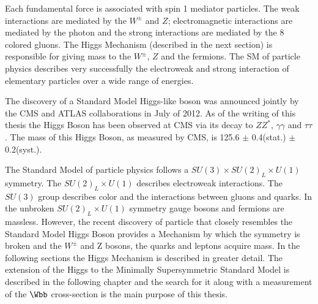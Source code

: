 Each fundamental force is associated with spin 1 mediator particles.
The weak interactions are mediated by the $W^{\pm}$ and $Z$;
electromagnetic interactions are mediated by the photon and the strong interactions
are mediated by the 8 colored gluons. The Higgs Mechanism (described in the next section) 
is responsible for giving mass to the $W^{\pm}$, $Z$ and the fermions. 
The SM of particle physics describes very successfully the electroweak and strong
interaction of elementary particles over a wide range of energies.

The discovery of a Standard Model Higgs-like boson was announced jointly 
by the CMS and ATLAS collaborations in July of 2012. %
As of the writing of this thesis the Higgs Boson has been observed at CMS via
its decay to $ZZ^{*}$, $\gamma\gamma$ and $\tau\tau$. The mass of this
Higgs Boson, as measured by CMS, is 125.6 $\pm$ 0.4(stat.) $\pm$ 0.2(syst.).

The Standard Model of particle physics follows a $SU(3)\times SU(2)_{L}\times U(1)$ %
symmetry. The $SU(2)_{L}\times U(1)$ describes electroweak interactions.
The $SU(3)$ group describes color and the interactions
between gluons and quarks. In the unbroken $SU(2)_{L}\times U(1)$ symmetry
gauge bosons and fermions are massless. However, the recent
discovery of particle that closely resembles the Standard Model Higgs
Boson provides a Mechanism by which the symmetry is broken
and the $W^{\pm}$ and Z bosons, the quarks and leptons acquire mass. 
In the following sections the Higgs Mechanism is described in greater detail.
The extension of the Higgs to the Minimally Supersymmetric Standard Model
is described in the following chapter and the search for it along with
a measurement of the $\Wbb$ cross-section is the main purpose of this
thesis.
